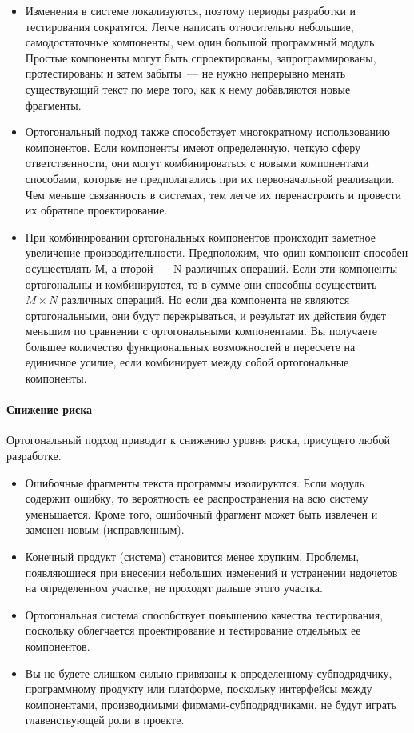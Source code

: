 \begin{itemize}
\item Изменения в системе локализуются, поэтому периоды разработки и
тестирования сократятся. Легче написать относительно небольшие, самодостаточные
компоненты, чем один большой программный модуль. Простые компоненты могут быть
спроектированы, запрограммированы, протестированы и затем забыты\ --- не нужно
непрерывно менять существующий текст по мере того, как к нему добавляются новые
фрагменты.

\item Ортогональный подход также способствует многократному использованию
компонентов. Если компоненты имеют определенную, четкую сферу ответственности,
они могут комбинироваться с новыми компонентами способами, которые не
предполагались при их первоначальной реализации. Чем меньше связанность в
системах, тем легче их перенастроить и провести их обратное проектирование.

\item При комбинировании ортогональных компонентов происходит заметное
увеличение производительности. Предположим, что один компонент способен
осуществлять М, а второй\ --- N различных операций. Если эти компоненты
ортогональны и комбинируются, то в сумме они способны осуществить $M\times N$
различных операций. Но если два компонента не являются ортогональными, они будут
перекрываться, и результат их действия будет меньшим по сравнении с
ортогональными компонентами. Вы получаете большее количество функциональных
возможностей в пересчете на единичное усилие, если комбинирует между собой
ортогональные компоненты.
\end{itemize}

\paragraph{Снижение риска}

Ортогональный подход приводит к снижению уровня риска, присущего любой
разработке.

\begin{itemize}
\item Ошибочные фрагменты текста программы изолируются. Если модуль содержит
ошибку, то вероятность ее распространения на всю систему уменьшается. Кроме
того, ошибочный фрагмент может быть извлечен и заменен новым (исправленным).

\item Конечный продукт (система) становится менее хрупким. Проблемы,
появляющиеся при внесении небольших изменений и устранении недочетов на
определенном участке, не проходят дальше этого участка.

\item Ортогональная система способствует повышению качества тестирования,
поскольку облегчается проектирование и тестирование отдельных ее компонентов.

\item Вы не будете слишком сильно привязаны к определенному субподрядчику,
программному продукту или платформе, поскольку интерфейсы между компонентами,
производимыми фирмами-субподрядчиками, не будут играть главенствующей роли в
проекте.
\end{itemize}
